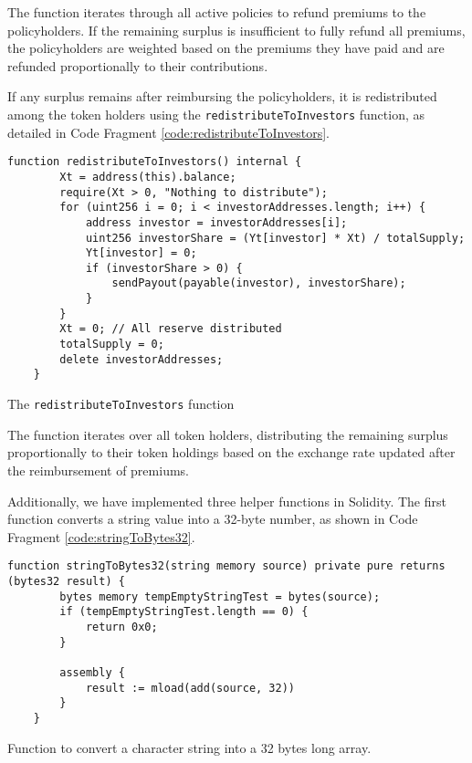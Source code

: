 \documentclass[10pt]{article}
\begin{document}
The function iterates through all active policies to refund premiums to the policyholders. If the remaining surplus is insufficient to fully refund all premiums, the policyholders are weighted based on the premiums they have paid and are refunded proportionally to their contributions. 

If any surplus remains after reimbursing the policyholders, it is redistributed among the token holders using the \texttt{redistributeToInvestors} function, as detailed in Code Fragment \ref{code:redistributeToInvestors}.

\begin{codefragment}[!ht]
\begin{lstlisting}[language=Solidity]
function redistributeToInvestors() internal {
        Xt = address(this).balance;
        require(Xt > 0, "Nothing to distribute");
        for (uint256 i = 0; i < investorAddresses.length; i++) {
            address investor = investorAddresses[i];
            uint256 investorShare = (Yt[investor] * Xt) / totalSupply;
            Yt[investor] = 0;
            if (investorShare > 0) {
                sendPayout(payable(investor), investorShare);
            }
        }
        Xt = 0; // All reserve distributed
        totalSupply = 0;
        delete investorAddresses;
    }
\end{lstlisting}
    \caption{The \texttt{redistributeToInvestors} function}
    \label{code:redistributeToInvestors}
\end{codefragment}

The function iterates over all token holders, distributing the remaining surplus proportionally to their token holdings based on the exchange rate updated after the reimbursement of premiums.

Additionally, we have implemented three helper functions in Solidity. The first function converts a string value into a 32-byte number, as shown in Code Fragment \ref{code:stringToBytes32}.

\begin{codefragment}[!h]
\begin{lstlisting}[language=Solidity]
    function stringToBytes32(string memory source) private pure returns (bytes32 result) {
        bytes memory tempEmptyStringTest = bytes(source);
        if (tempEmptyStringTest.length == 0) {
            return 0x0;
        }

        assembly {
            result := mload(add(source, 32))
        }
    }
    \end{lstlisting}
    \caption{Function to convert a character string into a 32 bytes long array.}
    \label{code:stringToBytes32}
\end{codefragment}
\end{document}
